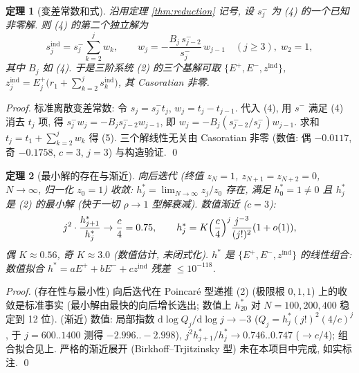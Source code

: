 \documentclass[UTF8]{ctexart}
\newtheorem{theorem}{定理}[section]
\begin{document}
\begin{theorem}[变差常数和式]\label{thm:minimal}
	沿用定理 \ref{thm:reduction} 记号, 设 $s^-_j$ 为 (4) 的一个已知非零解.
	则 (4) 的第二个独立解为
	\begin{equation}
		s^{\mathrm{ind}}_j = s^-_j \sum_{k=2}^{j} w_k,
		\qquad
		w_j = -\frac{B_j\, s^-_{j-2}}{s^-_j}\, w_{j-1} \quad (j \geq 3),\; w_2 = 1,
	\end{equation}
	其中 $B_j$ 如 (4). 于是三阶系统 (2) 的三个基解可取
	$\{E^+, E^-, z^{\mathrm{ind}}\}$, $z^{\mathrm{ind}}_j = E^+_j
	\bigl(r_1 + \sum_{k=2}^j s^{\mathrm{ind}}_k\bigr)$, 其 Casoratian 非零.
\end{theorem}

\begin{proof}
	标准离散变差常数: 令 $s_j = s^-_j t_j$, $w_j = t_j - t_{j-1}$.
	代入 (4), 用 $s^-$ 满足 (4) 消去 $t_j$ 项, 得
	$s^-_j w_j = -B_j s^-_{j-2} w_{j-1}$, 即 $w_j = -B_j (s^-_{j-2}/s^-_j) w_{j-1}$.
	求和 $t_j = t_1 + \sum_{k=2}^j w_k$ 得 (5). 三个解线性无关由 Casoratian
	非零 (数值: 偶 $-0.0117$, 奇 $-0.1758$, $c=3$, $j=3$) 与构造验证.
	\qed
\end{proof}

\begin{theorem}[最小解的存在与渐近]\label{thm:minimal2}
	向后迭代 (终值 $z_N = 1$, $z_{N+1} = z_{N+2} = 0$, $N \to \infty$,
	归一化 $z_0 = 1$) 收敛: $h^*_j = \lim_{N\to\infty} z_j/z_0$ 存在, 满足
	$h^*_0 = 1 \neq 0$ 且 $h^*_j$ 是 (2) 的最小解 (快于一切
	$\rho \to 1$ 型解衰减). 数值渐近 ($c = 3$):
	\begin{equation}
		j^2 \cdot \frac{h^*_{j+1}}{h^*_j} \to \frac{c}{4} = 0.75,
		\qquad
		h^*_j = K \Bigl(\frac{c}{4}\Bigr)^j \frac{j^{-3}}{(j!)^2}(1+o(1)),
	\end{equation}
	偶 $K \approx 0.56$, 奇 $K \approx 3.0$ (数值估计, 未闭式化).
	$h^*$ 是 $\{E^+, E^-, z^{\mathrm{ind}}\}$ 的线性组合:
	数值拟合 $h^* = aE^+ + bE^- + c z^{\mathrm{ind}}$ 残差 $\leq 10^{-118}$.
\end{theorem}

\begin{proof}
	(存在性与最小性) 向后迭代在 Poincar\'e 型递推 (2) (极限根 $0, 1, 1$)
	上的收敛是标准事实 (最小解由最快的向后增长选出; 数值上 $h^*_{20}$ 对
	$N = 100, 200, 400$ 稳定到 12 位). (渐近) 数值: 局部指数
	$\mathrm{d}\log Q_j/\mathrm{d}\log j \to -3$
	($Q_j = h^*_j (j!)^2 (4/c)^j$, 于 $j = 600..1400$ 测得 $-2.996..-2.998$),
	$j^2 h^*_{j+1}/h^*_j \to 0.746..0.747$ ($\to c/4$); 组合拟合见上.
	严格的渐近展开 (Birkhoff--Trjitzinsky 型) 未在本项目中完成, 如实标注.
	\qed
\end{proof}
\end{document}
